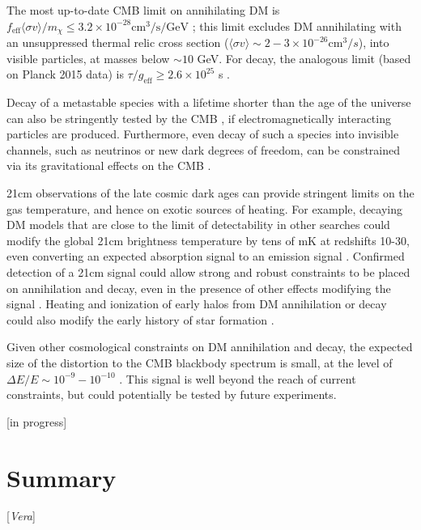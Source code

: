 \documentclass[12pt]{article}
\newcommand{\Contributors}[1]{ {\footnotesize [\textit{#1}]}}
\begin{document}
The most up-to-date CMB limit on annihilating DM is $f_\text{eff} \langle \sigma v \rangle/m_\chi \le 3.2\times 10^{-28} \text{cm}^3\text{/s/GeV}$ \cite{Aghanim:2018eyx}; this limit excludes DM annihilating with an unsuppressed thermal relic cross section ($\langle \sigma v \rangle \sim 2-3\times 10^{-26} \text{cm}^3/s$), into visible particles, at masses below $\sim 10$ GeV. For decay, the analogous limit (based on Planck 2015 data) is $\tau/g_\text{eff} \ge 2.6\times 10^{25}$ s \cite{Slatyer:2016qyl}.

Decay of a metastable species with a lifetime shorter than the age of the universe can also be stringently tested by the CMB \cite{Poulin:2016anj}, if electromagnetically interacting particles are produced. Furthermore, even decay of such a species into invisible channels, such as neutrinos or new dark degrees of freedom, can be constrained via its gravitational effects on the CMB \cite{Poulin:2016nat}.

21cm observations of the late cosmic dark ages can provide stringent limits on the gas temperature, and hence on exotic sources of heating. For example, decaying DM models that are close to the limit of detectability in other searches could modify the global 21cm brightness temperature by tens of mK at redshifts 10-30, even converting an expected absorption signal to an emission signal \cite{Poulin:2016anj}. Confirmed detection of a 21cm signal could allow strong and robust constraints to be placed on annihilation and decay, even in the presence of other effects modifying the signal \cite{Liu:2018uzy}. Heating and ionization of early halos from DM annihilation or decay could also modify the early history of star formation \cite{Schon:2014xoa}.

Given other cosmological constraints on DM annihilation and decay, the expected size of the distortion to the CMB blackbody spectrum is small, at the level of $\Delta E/E \sim 10^{-9}-10^{-10}$ \cite{Chluba:2016bvg}. This signal is well beyond the reach of current constraints, but could potentially be tested by future experiments.

[in progress]

\section{Summary}
\Contributors{Vera}



\end{document}

